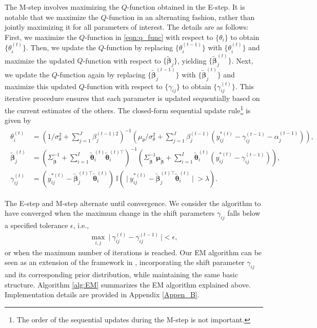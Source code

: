 \documentclass[11pt]{article}
\begin{document}
The M-step involves maximizing the $ Q $-function obtained in the E-step. It is notable that we maximize the $ Q $-function in an alternating fashion, rather than jointly maximizing it for all parameters of interest. The details are as follows: First, we maximize the $ Q $-function in \eqref{eqn:q_func} with respect to $ \{\theta_i\} $ to obtain $ \{\theta_i^{(t)}\} $. Then, we update the $ Q $-function by replacing $ \{\theta_i^{(t-1)}\} $ with $ \{\theta_i^{(t)}\} $ and maximize the updated $ Q $-function with respect to $ \{\boldsymbol{\tilde{\beta}}_j\} $, yielding $ \{\boldsymbol{\tilde{\beta}}_j^{(t)}\} $. Next, we update the $ Q $-function again by replacing $ \{\boldsymbol{\tilde{\beta}}_j^{(t-1)}\} $ with $ \{\boldsymbol{\tilde{\beta}}_j^{(t)}\} $ and maximize this updated $ Q $-function with respect to $ \{\gamma_{ij}\} $ to obtain $ \{\gamma_{ij}^{(t)}\} $. This iterative procedure ensures that each parameter is updated sequentially based on the current estimates of the others. The closed-form sequential update rule\footnote{The order of the sequential updates during the M-step is not important.} is given by
\begin{align}\label{eqn:update_rule}
\begin{split}
    \theta_i^{(t)} 
    &= \left(1/\sigma_{\theta}^{2} + \sum_{j = 1}^J \beta_j^{(t-1)2} \right)^{-1}  \left( \mu_{\theta}/\sigma_{\theta}^{2} + \sum_{j = 1}^J \beta_j^{(t-1)} \left(y_{ij}^{*(t)} - \gamma_{ij}^{(t-1)} - \alpha_j^{(t-1)}\right)\right), \\ 
    \boldsymbol{\tilde{\beta}}_j^{(t)} 
    &= \left(\Sigma_{\boldsymbol{\tilde{\beta}}}^{-1} + \sum_{i = 1}^I \boldsymbol{\tilde{\theta}}_i^{(t)} \boldsymbol{\tilde{\theta}}_i^{(t)\top} \right)^{-1}  \left( \Sigma_{\boldsymbol{\tilde{\beta}}}^{-1} \boldsymbol{\mu}_{\boldsymbol{\tilde{\beta}}} + \sum_{i = 1}^I \boldsymbol{\tilde{\theta}}_i^{(t)} \left(y_{ij}^{*(t)} - \gamma_{ij}^{(t-1)}\right)\right), \\ 
    \gamma_{ij}^{(t)} 
    &= \left( y_{ij}^{*(t)} - \boldsymbol{\tilde{\beta}}_j^{(t)\top} \boldsymbol{\tilde{\theta}}_i^{(t)}\right) ~ \mathbb{I}\left(~\Big|~y_{ij}^{*(t)} - \boldsymbol{\tilde{\beta}}_j^{(t)\top}\boldsymbol{\tilde{\theta}}_i^{(t)}~\Big|~ > \lambda\right).
\end{split}
\end{align}

The E-step and M-step alternate until convergence. We consider the algorithm to have converged when the maximum change in the shift parameters $ \gamma_{ij} $ falls below a specified tolerance $ \epsilon $, i.e.,
\begin{align}\label{con_cri}
\underset{i, j}{\max} ~\Big|~\gamma_{ij}^{(t)} - \gamma_{ij}^{(t-1)}~\Big| < \epsilon,
\end{align}
or when the maximum number of iterations is reached. 
Our EM algorithm can be seen as an extension of the framework in \cite{Imai2016}, incorporating the shift parameter $ \gamma_{ij} $ and its corresponding prior distribution, while maintaining the same basic structure.   
Algorithm \ref{alg:EM} summarizes the EM algorithm explained above. Implementation details are provided in Appendix \ref{Appen_B}.
\end{document}
